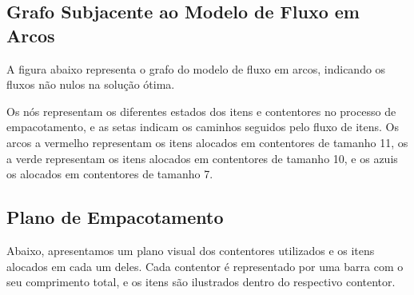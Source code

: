 \documentclass[a4paper,12pt]{article}
\begin{document}
\subsection*{Grafo Subjacente ao Modelo de Fluxo em Arcos}
A figura abaixo representa o grafo do modelo de fluxo em arcos, indicando os fluxos não nulos na solução ótima.

\begin{center}
\end{center}

Os nós representam os diferentes estados dos itens e contentores no processo de empacotamento, e as setas indicam os caminhos seguidos pelo fluxo de itens.
Os arcos a vermelho representam os itens alocados em contentores de tamanho 11, os a verde representam os itens alocados em contentores de tamanho 10, e os azuis os alocados em contentores de tamanho 7.

\subsection*{Plano de Empacotamento}
Abaixo, apresentamos um plano visual dos contentores utilizados e os itens alocados em cada um deles.
Cada contentor é representado por uma barra com o seu comprimento total, e os itens são ilustrados dentro do respectivo contentor.
\end{document}
